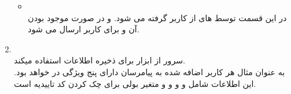 \documentclass[12pt,onecolumn,a4paper]{article}
\begin{document}
\begin{enumerate}
\begin{itemize}
\item {}
\\
در این قسمت
توسط 
های 
از کاربر گرفته می شود. و در صورت موجود بودن آن
و
برای کاربر ارسال می شود.
\end{itemize}
\item {}
\\
سرور
از ابزار 
برای ذخیره اطلاعات استفاده میکند.
\\
به عنوان مثال هر کاربر اضافه شده به پیامرسان دارای پنج ویژگی در 
خواهد بود. این اطلاعات شامل
و
و
و
و متغیر بولی 
برای چک کردن کد تاییدیه است.


\end{enumerate}
\end{document}
